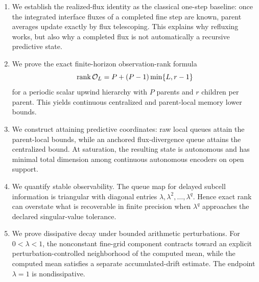 \documentclass[preprint,12pt]{elsarticle}
\theoremstyle{plain}
\theoremstyle{remark}
\theoremstyle{definition}
\DeclareMathOperator{\rank}{rank}
\begin{document}
\begin{enumerate}
\item We establish the realized-flux identity as the classical one-step
baseline: once the integrated interface fluxes of a completed fine step are
known, parent averages update exactly by flux telescoping.  This explains why
refluxing works, but also why a completed flux is not automatically a
recursive predictive state.

\item We prove the exact finite-horizon observation-rank formula
\[
  \rank {\cal O}_L =
  P+(P-1)\min\{L,r-1\}
\]
for a periodic scalar upwind hierarchy with \(P\) parents and \(r\) children
per parent.  This yields continuous centralized and parent-local memory
lower bounds.

\item We construct attaining predictive coordinates: raw local queues attain
the parent-local bounds, while an anchored flux-divergence queue attains the
centralized bound.  At saturation, the resulting state is autonomous and has
minimal total dimension among continuous autonomous encoders on open support.

\item We quantify stable observability.  The queue map for delayed subcell
information is triangular with diagonal entries
\(\lambda,\lambda^2,\ldots,\lambda^q\).  Hence exact rank can overstate what
is recoverable in finite precision when \(\lambda^q\) approaches the
declared singular-value tolerance.

\item We prove dissipative decay under bounded arithmetic perturbations.  For
\(0<\lambda<1\), the nonconstant fine-grid component contracts toward an
explicit perturbation-controlled neighborhood of the computed mean, while
the computed mean satisfies a separate accumulated-drift estimate.  The
endpoint \(\lambda=1\) is nondissipative.
\end{enumerate}


\end{document}

